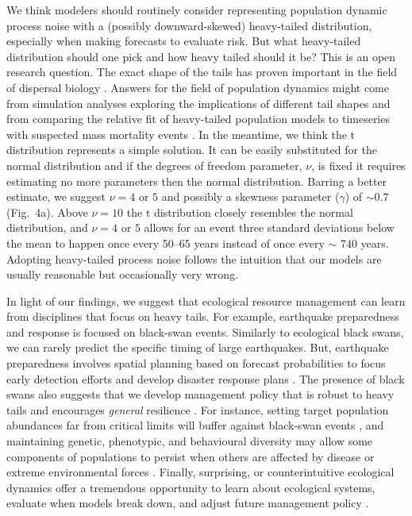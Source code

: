 We think modelers should routinely consider representing population dynamic
process noise with a (possibly downward-skewed)
heavy-tailed distribution,
especially when making forecasts to evaluate risk.
But what heavy-tailed distribution should one pick
and how heavy tailed should it be?
This is an open research question.
The exact shape of the tails has proven important
in the field of dispersal biology \citep{kot1996, clark1999}.
Answers for the field of population dynamics
might come from simulation analyses exploring
the implications of different tail shapes and
from comparing the relative fit of heavy-tailed
population models to timeseries
with suspected mass mortality events
\citep[e.g.~the t distribution compared to a mixture
of two normal distributions;][]{ward2007}.
In the meantime, we think the t distribution
represents a simple solution.
It can be easily substituted for the normal distribution
and if the degrees of freedom parameter, $\nu$,
is fixed
it requires estimating no more parameters
then the normal distribution.
Barring a better estimate, we suggest $\nu = 4$ or $5$ and possibly a skewness parameter ($\gamma$) of $\sim 0.7$ (Fig.~4a).
Above $\nu  =  10$ the t distribution closely resembles
the normal distribution,
and $\nu  = 4$ or $5$ allows for an event
three standard deviations below the mean to happen
once every 50--65 years instead of once every $\sim$ 740 years.
Adopting heavy-tailed process noise follows the intuition
that our models are usually reasonable but occasionally very wrong.

In light of our findings, we suggest that ecological resource management can
learn from disciplines that focus on heavy tails. For example, earthquake
preparedness and response is focused on black-swan events. Similarly to
ecological black swans, we can rarely predict the specific timing of large
earthquakes. But, earthquake preparedness involves spatial planning based on
forecast probabilities to focus early detection efforts and develop disaster
response plans \citep{nrc2007}. The presence of black swans also suggests that we
develop management policy that is robust to heavy tails and encourages
\textit{general} resilience \citep{carpenter2012}. For instance, setting target
population abundances far from critical limits will buffer against black-swan
events \citep{caddy1996}, and maintaining genetic, phenotypic, and behavioural
diversity may allow some components of populations to persist when others are
affected by disease or extreme environmental forces \citep{schindler2010}.
Finally, surprising, or counterintuitive ecological dynamics offer a tremendous
opportunity to learn about ecological systems, evaluate when models break down,
and adjust future management policy \citep{doak2008, lindenmayer2010}.

